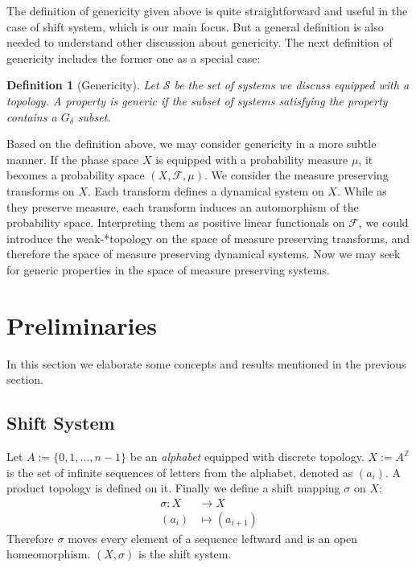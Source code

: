 \documentclass{article}
\newtheorem{definition}{Definition}
\begin{document}
\begin{CJK}{UTF8}{gbsn}
The definition of genericity given above is quite straightforward and useful in the case of shift system, which is our main focus. But a general definition is also needed to understand other discussion about genericity. The next definition of genericity includes the former one as a special case:

\begin{definition}[Genericity]
	 Let $\mathscr{S}$ be the set of systems we discuss equipped with a topology. A property is generic if the subset of systems satisfying the property contains a $G_\delta$ subset.
\end{definition}

Based on the definition above, we may consider genericity in a more subtle manner. If the phase space $X$ is equipped with a probability measure $\mu$, it becomes a probability space $(X,\mathscr{F},\mu)$. We consider the measure preserving transforms on $X$. Each transform defines a dynamical system on $X$. While as they preserve measure, each transform induces an automorphism of the probability space. Interpreting them as positive linear functionals on  $\mathscr{F}$, we could introduce the weak-*topology on the space of measure preserving transforms, and therefore  the space of measure preserving dynamical systems. Now we may seek for generic properties in the space of measure preserving systems.


\section{Preliminaries}
In this section we elaborate some concepts and results mentioned in the previous section.




\subsection{Shift System}

Let $A:=\{0,1,\dots ,n-1\}$ be an \textit{alphabet} equipped with discrete topology. $X:=A^\mathbb{Z}$ is the set of infinite sequences of letters from the alphabet, denoted as $(a_i)$. A product topology is defined on it. Finally we define a shift mapping $\sigma$ on $X$:
\begin{align*}
	\sigma:X&\rightarrow X \\
	(a_i)&\mapsto(a_{i+1})
\end{align*}
Therefore $\sigma$ moves every element of a sequence leftward and is an open homeomorphism.
$(X,\sigma)$ is the shift system.


\end{CJK}
\end{document}
